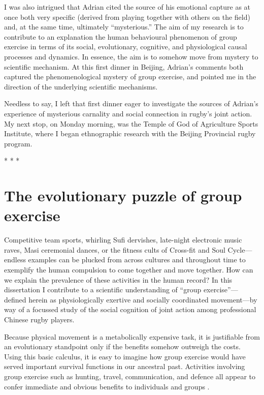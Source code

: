 \begin{CJK}{UTF8}{gbsn}
I was also intrigued that Adrian cited the source of his emotional capture as at once both very specific (derived from playing together with others on the field) and, at the same time, ultimately ``mysterious.''  The aim of my research is to contribute to an explanation the human behavioural phenomenon of group exercise in terms of its social, evolutionary, cognitive, and physiological causal processes and dynamics.  In essence, the aim is to somehow move from mystery to scientific mechanism.  At this first dinner in Beijing, Adrian's comments both captured the phenomenological mystery of group exercise, and pointed me in the direction of the underlying scientific mechanisms.

Needless to say, I left that first dinner eager to investigate the sources of Adrian's experience of mysterious carnality and social connection in rugby's joint action.  My next stop, on Monday morning, was the Temple of God of Agriculture Sports Institute, where I began ethnographic research with the Beijing Provincial rugby program.


                            \begin{center}
                              * * *
                            \end{center}





\section{The evolutionary puzzle of group exercise}
Competitive team sports, whirling Sufi dervishes, late-night electronic music raves, Masi ceremonial dances, or the fitness cults of Cross-fit and Soul Cycle---endless examples can be plucked from across cultures and throughout time to exemplify the human compulsion to come together and move together.  How can we explain the prevalence of these activities in the human record?  In this dissertation I contribute to a scientific understanding of ``group exercise''---defined herein as physiologically exertive and socially coordinated movement---by way of a focussed study of the social cognition of joint action among professional Chinese rugby players.

Because physical movement is a metabolically expensive task, it is justifiable from an evolutionary standpoint only if the benefits somehow outweigh the costs.  Using this basic calculus, it is easy to imagine how group exercise would have served important survival functions in our ancestral past.  Activities involving group exercise such as hunting, travel, communication, and defence all appear to confer immediate and obvious benefits to individuals and groups \citep{Sands2010}.


\end{CJK}
